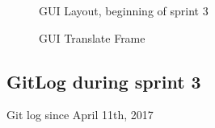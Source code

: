 \documentclass[11pt]{article} %
\begin{document}
{  \begin{figure}[H]
  	\centering
  	\caption{GUI Layout, beginning of sprint 3}
  	\label{fig:GUI Design Start Sprint 3}
  \end{figure}
  
    \begin{figure}[H]
  	\centering
  	\caption{GUI Translate Frame}
  	\label{fig:GUI TranslateFrame}
  \end{figure}

\newpage
\subsection{GitLog during sprint 3}
Git log since April 11th, 2017




}
\end{document}

